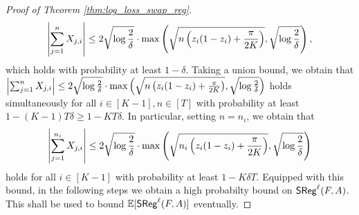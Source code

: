 \begin{proof}[Proof of Theorem \ref{thm:log_loss_swap_reg}]
\begin{align*}
        \left\lvert\sum_{j = 1} ^ {n} X_{j, i}\right\rvert \le 2\sqrt{\log \frac{2}{\delta}} \cdot\max\left( \sqrt{n\left( z_{i}(1 - z_{i}) + \frac{\pi}{2K} \right)}, \sqrt{\log \frac{2}{\delta}} \right),
    \end{align*}
    which holds with probability at least $1 - \delta$. Taking a union bound, we obtain that $\left\lvert\sum_{j = 1} ^ {n} X_{j, i}\right\rvert \le 2\sqrt{\log \frac{2}{\delta}} \cdot\max\left( \sqrt{n\left( z_{i}(1 - z_{i}) + \frac{\pi}{2K} \right)}, \sqrt{\log \frac{2}{\delta}} \right)$ holds simultaneously for all $i \in [K - 1], n \in [T]$ with probability at least $1 - (K - 1)T\delta \ge 1 - K T \delta$. In particular, setting $n = n_{i}$, we obtain that \begin{align}\label{eq:hp_bound_sum_X}
        \left\lvert\sum_{j = 1} ^ {n_{i}} X_{j, i}\right\rvert \le 2\sqrt{\log \frac{2}{\delta}} \cdot\max\left( \sqrt{n_{i}\left( z_{i}(1 - z_{i}) + \frac{\pi}{2K} \right)}, \sqrt{\log \frac{2}{\delta}} \right)
    \end{align}
    holds for all $i \in [K - 1]$ with probability at least $1 - K \delta T$. Equipped with this bound, in the following steps we obtain a high probabilty bound on $\mathsf{SReg}^{\ell}(F, A)$. This shall be used to bound $\mathbb{E}[\mathsf{SReg}^{\ell}(F, A)]$ eventually.
    

\end{proof}
